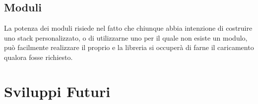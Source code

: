\subsection{Moduli}
La potenza dei moduli risiede nel fatto che chiunque abbia intenzione di costruire uno stack personalizzato, o di utilizzarne uno per il quale non esiste un modulo, pu\`o facilmente realizzare il proprio e la libreria si occuper\`a di farne il caricamento qualora fosse richiesto.
\section{Sviluppi Futuri}
\clearpage{\pagestyle{empty}\cleardoublepage} 
